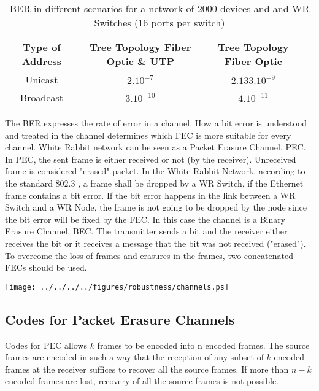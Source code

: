 \begin{table}[!ht]
        \begin{center}
                \begin{tabular}{|c|c|c|c|}
		\hline
			 Type of Address & Tree Topology Fiber Optic \& UTP &  Tree Topology Fiber Optic \\ \hline
			 Unicast & $2.10^{-7}$   &  $ 2.133.10^{-9}$ \\ \hline 
			 Broadcast& $3.10^{-10} $ & $4.10^{-11}$ \\ \hline
		\end{tabular}
          \caption{BER in different scenarios for a network of 2000 devices and and WR Switches (16 ports per switch)}
	  \label{tab:BER_WR}
	\end{center}
\end{table}

The BER expresses the rate of error in a channel. How a bit error is
understood and treated in the channel determines which FEC is more suitable for
every channel. White Rabbit network can be seen as a Packet Erasure Channel,
PEC. In PEC, the sent frame is either received or not (by the receiver).
Unreceived frame is considered "erased" packet. In the White Rabbit
Network, according to the standard 802.3 \cite{IEEE8023}, a frame shall be
dropped by a WR Switch, if the Ethernet frame contains a bit error. If the bit
error happens in the link between a WR Switch and a WR Node, the frame is not
going to be dropped by the node since the bit error will be fixed by the FEC. In
this case the channel is a Binary Erasure Channel, BEC. The transmitter sends a
bit and the receiver either receives the bit or it receives a message that the
bit was not received ("erased"). To overcome the loss of frames and erasures in
the frames, two concatenated FECs should be used.

\begin{center}
	\texttt{[image: ../../../../figures/robustness/channels.ps]}
	\label{fig:wr_channels}
\end{center}

\subsection{Codes for Packet Erasure Channels}

Codes for PEC allows $k$ frames to be encoded into n encoded frames. The source
frames are encoded in such a way that the reception of any subset of $k$ encoded
frames at the receiver suffices to recover all the source frames. If more
than $n-k$ encoded frames are lost, recovery of all the source frames is not
possible.

